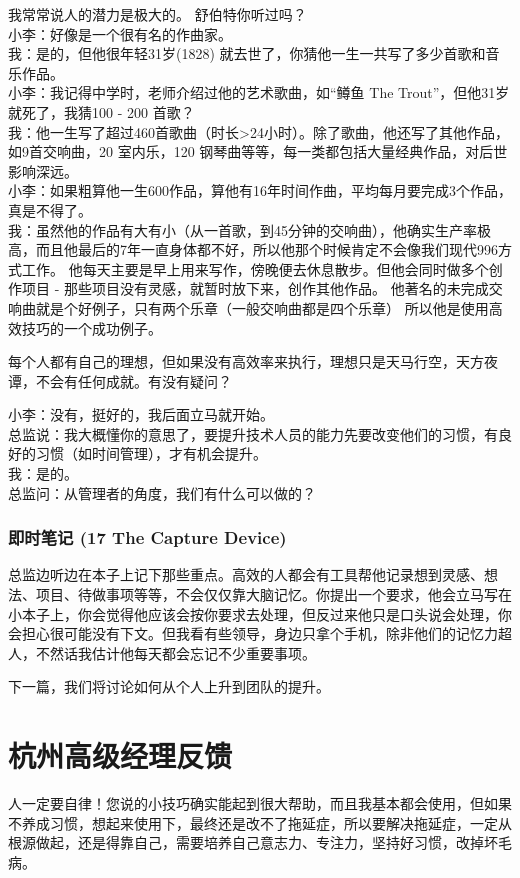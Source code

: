 我常常说人的潜力是极大的。 舒伯特你听过吗？\\
小李：好像是一个很有名的作曲家。\\
我：是的，但他很年轻31岁(1828)
就去世了，你猜他一生一共写了多少首歌和音乐作品。\\
小李：我记得中学时，老师介绍过他的艺术歌曲，如``鳟鱼 The
Trout''，但他31岁就死了，我猜100 - 200 首歌？\\
我：他一生写了超过460首歌曲（时长\textgreater{}24小时）。除了歌曲，他还写了其他作品，如9首交响曲，20
室内乐，120 钢琴曲等等，每一类都包括大量经典作品，对后世影响深远。\\
小李：如果粗算他一生600作品，算他有16年时间作曲，平均每月要完成3个作品，真是不得了。\\
我：虽然他的作品有大有小（从一首歌，到45分钟的交响曲），他确实生产率极高，而且他最后的7年一直身体都不好，所以他那个时候肯定不会像我们现代996方式工作。
他每天主要是早上用来写作，傍晚便去休息散步。但他会同时做多个创作项目 -
那些项目没有灵感，就暂时放下来，创作其他作品。
他著名的未完成交响曲就是个好例子，只有两个乐章（一般交响曲都是四个乐章）
所以他是使用高效技巧的一个成功例子。

每个人都有自己的理想，但如果没有高效率来执行，理想只是天马行空，天方夜谭，不会有任何成就。有没有疑问？

小李：没有，挺好的，我后面立马就开始。\\

总监说：我大概懂你的意思了，要提升技术人员的能力先要改变他们的习惯，有良好的习惯（如时间管理），才有机会提升。\\
我：是的。\\
总监问：从管理者的角度，我们有什么可以做的？\\

\hypertarget{ux5373ux65f6ux7b14ux8bb0-17-the-capture-device}{%
\subsubsection{即时笔记 (17 The Capture
Device)}\label{ux5373ux65f6ux7b14ux8bb0-17-the-capture-device}}

总监边听边在本子上记下那些重点。高效的人都会有工具帮他记录想到灵感、想法、项目、待做事项等等，不会仅仅靠大脑记忆。你提出一个要求，他会立马写在小本子上，你会觉得他应该会按你要求去处理，但反过来他只是口头说会处理，你会担心很可能没有下文。但我看有些领导，身边只拿个手机，除非他们的记忆力超人，不然话我估计他每天都会忘记不少重要事项。

下一篇，我们将讨论如何从个人上升到团队的提升。\\

\hypertarget{ux676dux5ddeux9ad8ux7ea7ux7ecfux7406ux53cdux9988}{%
\section{杭州高级经理反馈}\label{ux676dux5ddeux9ad8ux7ea7ux7ecfux7406ux53cdux9988}}

人一定要自律！您说的小技巧确实能起到很大帮助，而且我基本都会使用，但如果不养成习惯，想起来使用下，最终还是改不了拖延症，所以要解决拖延症，一定从根源做起，还是得靠自己，需要培养自己意志力、专注力，坚持好习惯，改掉坏毛病。\\

\cite{prod1References1}
